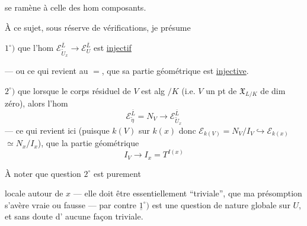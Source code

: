
se ramène à celle des hom composants.

À ce sujet, sous réserve de vérifications, je présume

$1^\circ)$ que l'hom $\mathcal E_{\tilde U_x}^{\bar L}\longrightarrow\mathcal E_U^{\bar L}$ est \uline{injectif}

--- ou ce qui revient au $=$, que sa partie géométrique
est \uline{injective}.


$2^\circ)$ que  lorsque le corps résiduel de $V$ est alg $/K$ (i.e. $V$   un pt de $\mathfrak X_{L/K}$ de dim zéro), alors l'hom
\[
 \mathcal E_{\tilde\eta}^{\bar L}=N_V\longrightarrow\mathcal E_{\tilde U_x}^{\bar L}
\]
    --- ce qui revient ici (puisque $k(V)$   sur $k(x)$ donc $\mathcal E_{k(V)}=N_V/I_V\hookrightarrow\mathcal E_{k(x)}$  $\simeq N_x/I_x$), que la partie géométrique
\[
 I_V\longrightarrow I_x=T^{I(x)}
\]
    

À noter que  question $2^\circ$ est purement

locale autour de $x$ --- elle doit être essentiellement ``triviale'', que ma présomption s'avère vraie ou fausse --- par contre $\underline{1}^\circ)$ est une question de nature globale sur $U$, et sans doute d' aucune façon triviale.


